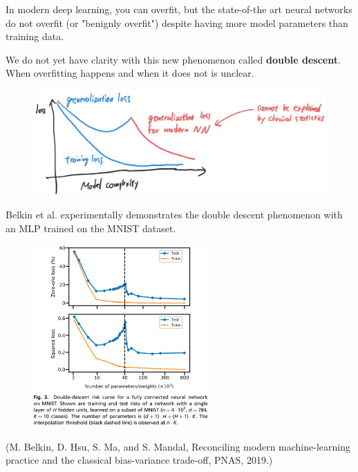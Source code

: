 \begin{definition}
    In modern deep learning, you can overfit, but the state-of-the art neural networks do not overfit (or "benignly overfit") despite having more model parameters than training data.

    We do not yet have clarity with this new phenomenon called \textbf{double descent}. When overfitting happens and when it does not is unclear.

    \begin{figure}[H]
        \centering
        \includegraphics[width=1.0\textwidth]{.././assets/6.4.jpg}
    \end{figure}
\end{definition}

\begin{example}
    Belkin et al. experimentally demonstrates the double descent phenomenon with an MLP trained on the MNIST dataset.

    \begin{figure}[H]
        \centering
        \includegraphics[width=0.6\textwidth]{.././assets/6.5.png}
    \end{figure}

    (M. Belkin, D. Hsu, S. Ma, and S. Mandal, Reconciling modern machine-learning practice and the classical bias-variance trade-off, PNAS, 2019.)
\end{example}


